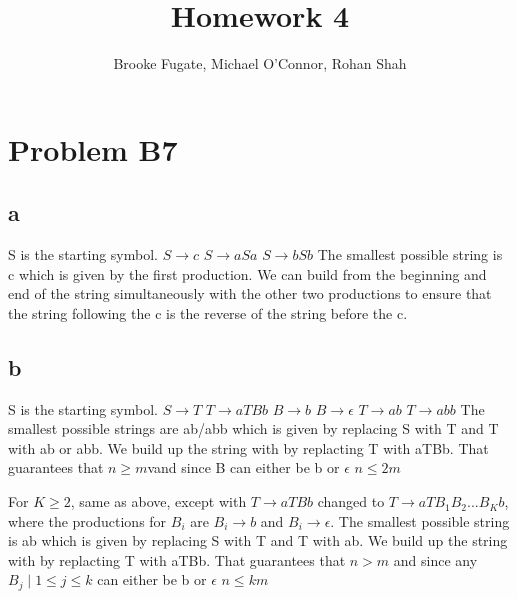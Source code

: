 \documentclass[12pt]{article}
\begin{document}
\pagestyle{plain}
\titleformat{\subsection}[runin]
  {\normalfont\large\bfseries}{\thesubsection}{1em}{}

\title{Homework 4}
\author{Brooke Fugate, Michael O'Connor, Rohan Shah}
\date{}

\maketitle

\section*{Problem B7}
\subsection*{a} S is the starting symbol. \newline
$S \rightarrow c$ \newline
$S \rightarrow aSa$ \newline
$S \rightarrow bSb$ \newline
The smallest possible string is c which is given by the first production. We can build from the beginning and end of the string simultaneously with the other two productions to ensure that the string following the c is the reverse of the string before the c.
\subsection*{b} S is the starting symbol. \newline
$S \rightarrow T$ \newline
$T \rightarrow aTBb$ \newline
$B \rightarrow b$ \newline
$B \rightarrow \epsilon$ \newline
$T \rightarrow ab$ \newline
$T \rightarrow abb$ \newline
The smallest possible strings are ab/abb which is given by replacing S with T and T with ab or abb. We build up the string with by replacting T with aTBb. That guarantees that $n \ge m$vand since B can either be b or $\epsilon$ $n \le 2m$\newline

For $K \ge 2$, same as above, except with $T \rightarrow aTBb$ changed to $T \rightarrow aTB_1B_2...B_Kb$, where the productions for $B_i$ are $B_i \rightarrow b$ and $B_i \rightarrow \epsilon$.\newline
The smallest possible string is ab which is given by replacing S with T and T with ab. We build up the string with by replacting T with aTBb.  That guarantees that $n > m$ and since any $B_j \mid 1 \le j \le k$ can either be b or $\epsilon$ $n \le km$
\end{document}
